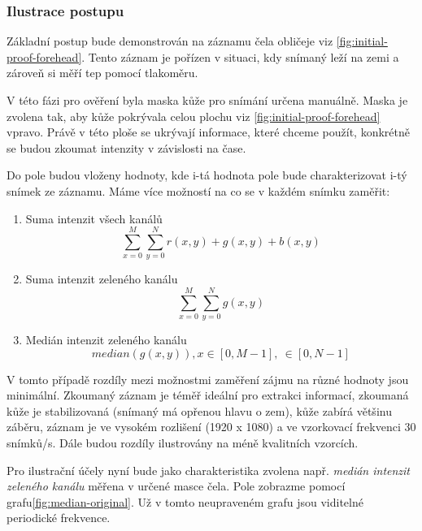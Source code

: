 \documentclass[
  digital, %
  table,   %
%
  lof,     %
  lot,     %
]{fithesis3}
\begin{document}
\subsubsection{Ilustrace postupu}
Základní postup bude demonstrován na záznamu čela obličeje viz \ref{fig:initial-proof-forehead}. Tento záznam je pořízen v situaci, kdy snímaný leží na zemi a zároveň si měří tep pomocí tlakoměru.

V této fázi pro ověření byla maska kůže pro snímání určena manuálně. Maska je zvolena tak, aby kůže pokrývala celou plochu viz \ref{fig:initial-proof-forehead} vpravo. Právě v této ploše se ukrývají informace, které chceme použít, konkrétně se budou zkoumat intenzity v závislosti na čase.

Do pole budou vloženy hodnoty, kde i-tá hodnota pole bude charakterizovat i-tý snímek ze záznamu. Máme více možností na co se v každém snímku zaměřit:
\begin{enumerate}
  \item{Suma intenzit všech kanálů}
  \begin{equation}
  	\sum_{x=0}^M \sum_{y=0}^N r(x,y) + g(x,y) + b(x,y)
    \label{suma-all-channels}
  \end{equation}

  \item{Suma intenzit zeleného kanálu}
  \begin{equation}
  	\sum_{x=0}^M \sum_{y=0}^N g(x,y)
    \label{suma-green-channel}
  \end{equation}

  \item{Medián intenzit zeleného kanálu}
  \begin{equation}
  	median(g(x,y)), x \in [0, M-1], \ \in [0, N-1]
    \label{median-green-values}
  \end{equation}

\end{enumerate}

V tomto případě rozdíly mezi možnostmi zaměření zájmu na různé hodnoty jsou minimální. Zkoumaný záznam je téměř ideální pro extrakci informací, zkoumaná kůže je stabilizovaná (snímaný má opřenou hlavu o zem), kůže zabírá většinu záběru, záznam je ve vysokém rozlišení (1920 x 1080) a ve vzorkovací frekvenci 30 snímků/s. Dále budou rozdíly ilustrovány na méně kvalitních vzorcích.

Pro ilustrační účely nyní bude jako charakteristika zvolena např. \emph{medián intenzit zeleného kanálu} měřena v určené masce čela. Pole zobrazme pomocí grafu\ref{fig:median-original}. Už v tomto neupraveném grafu jsou viditelné periodické frekvence.
\end{document}
